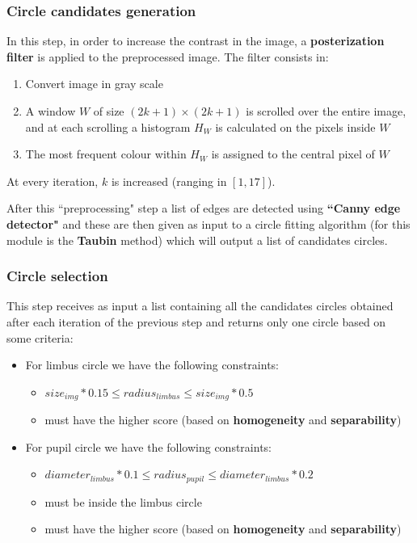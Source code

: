 \documentclass{article}
\begin{document}
\subsubsection{Circle candidates generation}
In this step, in order to increase the contrast in the image, a \textbf{posterization filter} is applied to the preprocessed image. The filter consists in:
\begin{enumerate}
    \item Convert image in gray scale
    \item A window $W$ of size $(2k + 1)\times (2k + 1)$ is scrolled over the entire image, and at each scrolling a histogram $H_W$ is calculated on the pixels inside $W$
    \item The most frequent colour within $H_W$ is assigned to the central pixel of $W$
\end{enumerate}

At every iteration, $k$ is increased (ranging in $[1, 17]$).

After this ``preprocessing" step a list of edges are detected using \textbf{``Canny edge detector"} and these are then given as input to a circle fitting algorithm (for this module is the \textbf{Taubin} method) which will output a list of candidates circles.

\subsubsection{Circle selection}
This step receives as input a list containing all the candidates circles obtained after each iteration of the previous step and returns only one circle based on some criteria:
\begin{itemize}
    \item For limbus circle we have the following constraints:
    \begin{itemize}
        \item $ size_{img}*0.15 \leq radius_{limbus} \leq size_{img}*0.5$
        \item must have the higher score (based on \textbf{homogeneity} and \textbf{separability})
    \end{itemize}
    \item For pupil circle we have the following constraints:
    \begin{itemize}
        \item $diameter_{limbus}*0.1 \leq radius_{pupil} \leq diameter_{limbus}*0.2$
        \item must be inside the limbus circle
        \item must have the higher score (based on \textbf{homogeneity} and \textbf{separability})
    \end{itemize}
\end{itemize}
\end{document}
